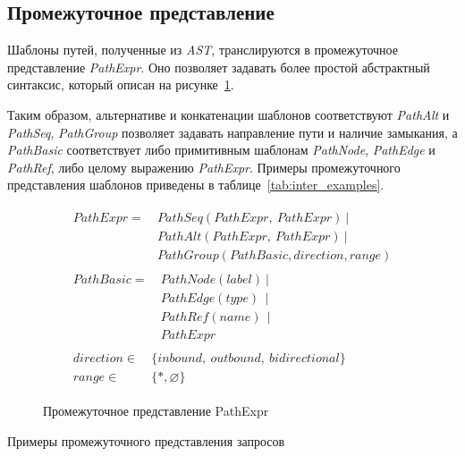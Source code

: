 \subsection{Промежуточное представление}\label{matrix-translation}
Шаблоны путей, полученные из \textit{AST}, транслируются в промежуточное представление \textit{PathExpr}. Оно позволяет задавать более простой абстрактный синтаксис, который описан на рисунке~\ref{fig:intermidiate_repr}. 

Таким образом, альтернативе и конкатенации шаблонов соответствуют \textit{PathAlt} и \textit{PathSeq}, \textit{PathGroup} позволяет задавать направление пути и наличие замыкания, а \textit{PathBasic} соответствует либо примитивным шаблонам \textit{PathNode}, \textit{PathEdge} и \textit{PathRef}, либо целому выражению \textit{PathExpr}. Примеры промежуточного представления шаблонов приведены в таблице~\ref{tab:inter_examples}.
\begin{figure}[h!]
\begin{align*}
\begin{split}
PathExpr=~ &PathSeq(PathExpr,~PathExpr)~|\\
           &PathAlt(PathExpr,~PathExpr)~|\\
           &PathGroup(PathBasic, direction, range)
\end{split}\\
\begin{split}
PathBasic=~ &PathNode(label)~|\\
            &PathEdge(type)~~|\\
            &PathRef(name) ~~|\\
            &PathExpr
\end{split}\\
\begin{split}
direction \in ~&\{inbound,~outbound,~bidirectional\}\\
range \in     ~&\{*, \varnothing\}
\end{split}
\end{align*}
\caption{Промежуточное представление PathExpr}
\label{fig:intermidiate_repr}
\end{figure}

\begin{table}[h]
\centering
\begin{adjustbox}{max width=\textwidth}

\end{adjustbox}
\caption{Примеры промежуточного представления запросов}
\label{tab:inter_examples}
\end{table}

